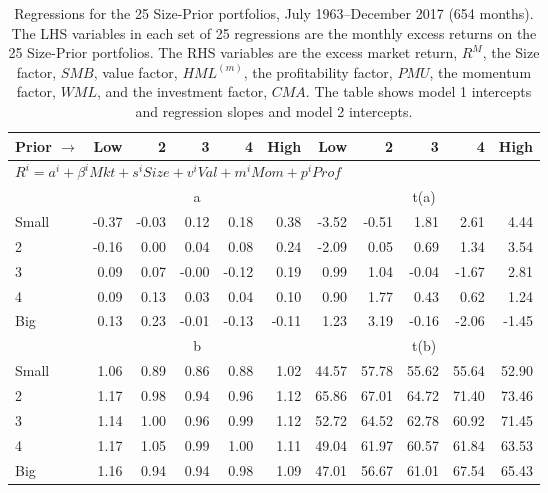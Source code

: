 
\begin{table}[!ht]
\footnotesize
\centering
\caption{
Regressions for the 25 Size-Prior portfolios, July 1963–December 2017 (654 months).
\scriptsize{
The LHS variables in each set of 25 regressions are the monthly excess returns
on the 25 Size-Prior portfolios.
The RHS variables are
the excess market return, $R^M$,
the Size factor, $SMB$,
value factor, $HML^{(m)}$,
the profitability factor, $PMU$,
the momentum factor, $WML$, and
the investment factor, $CMA$.
The table shows model 1 intercepts and regression slopes and
model 2 intercepts.
}
}
\begin{tabular}{lrrrrrrrrrr}
  \toprule
    
    Prior $\rightarrow$ & Low & 2 & 3 & 4 & High & Low & 2 & 3 & 4 & High  \\ 
  \midrule
  \multicolumn{11}{l}{$R^i=a^i+\beta^iMkt+s^iSize+v^iVal+m^iMom+p^iProf$}  \\
  
     & \multicolumn{5}{c}{a} & \multicolumn{5}{c}{t(a)}   \\
     \cmidrule(r){2-6} \cmidrule(r){7-11} 
    Small  & -0.37  & -0.03  & 0.12  & 0.18  & 0.38  & -3.52  & -0.51  & 1.81  & 2.61  & 4.44   \\
    2  & -0.16  & 0.00  & 0.04  & 0.08  & 0.24  & -2.09  & 0.05  & 0.69  & 1.34  & 3.54   \\
    3  & 0.09  & 0.07  & -0.00  & -0.12  & 0.19  & 0.99  & 1.04  & -0.04  & -1.67  & 2.81   \\
    4  & 0.09  & 0.13  & 0.03  & 0.04  & 0.10  & 0.90  & 1.77  & 0.43  & 0.62  & 1.24   \\
    Big  & 0.13  & 0.23  & -0.01  & -0.13  & -0.11  & 1.23  & 3.19  & -0.16  & -2.06  & -1.45   \\
    
     & \multicolumn{5}{c}{b} & \multicolumn{5}{c}{t(b)}   \\
     \cmidrule(r){2-6} \cmidrule(r){7-11} 
    Small  & 1.06  & 0.89  & 0.86  & 0.88  & 1.02  & 44.57  & 57.78  & 55.62  & 55.64  & 52.90   \\
    2  & 1.17  & 0.98  & 0.94  & 0.96  & 1.12  & 65.86  & 67.01  & 64.72  & 71.40  & 73.46   \\
    3  & 1.14  & 1.00  & 0.96  & 0.99  & 1.12  & 52.72  & 64.52  & 62.78  & 60.92  & 71.45   \\
    4  & 1.17  & 1.05  & 0.99  & 1.00  & 1.11  & 49.04  & 61.97  & 60.57  & 61.84  & 63.53   \\
    Big  & 1.16  & 0.94  & 0.94  & 0.98  & 1.09  & 47.01  & 56.67  & 61.01  & 67.54  & 65.43   \\



\end{tabular}
\end{table}
